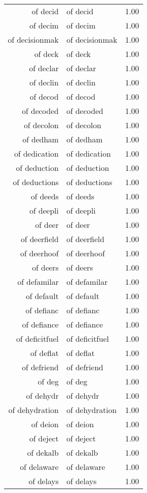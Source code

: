 \begin{table}[ht]
\begin{tabular}{rlr}
  of decid & of decid & 1.00 \\ 
  of decim & of decim & 1.00 \\ 
  of decisionmak & of decisionmak & 1.00 \\ 
  of deck & of deck & 1.00 \\ 
  of declar & of declar & 1.00 \\ 
  of declin & of declin & 1.00 \\ 
  of decod & of decod & 1.00 \\ 
  of decoded & of decoded & 1.00 \\ 
  of decolon & of decolon & 1.00 \\ 
  of dedham & of dedham & 1.00 \\ 
  of dedication & of dedication & 1.00 \\ 
  of deduction & of deduction & 1.00 \\ 
  of deductions & of deductions & 1.00 \\ 
  of deeds & of deeds & 1.00 \\ 
  of deepli & of deepli & 1.00 \\ 
  of deer & of deer & 1.00 \\ 
  of deerfield & of deerfield & 1.00 \\ 
  of deerhoof & of deerhoof & 1.00 \\ 
  of deers & of deers & 1.00 \\ 
  of defamilar & of defamilar & 1.00 \\ 
  of default & of default & 1.00 \\ 
  of defianc & of defianc & 1.00 \\ 
  of defiance & of defiance & 1.00 \\ 
  of deficitfuel & of deficitfuel & 1.00 \\ 
  of deflat & of deflat & 1.00 \\ 
  of defriend & of defriend & 1.00 \\ 
  of deg & of deg & 1.00 \\ 
  of dehydr & of dehydr & 1.00 \\ 
  of dehydration & of dehydration & 1.00 \\ 
  of deion & of deion & 1.00 \\ 
  of deject & of deject & 1.00 \\ 
  of dekalb & of dekalb & 1.00 \\ 
  of delaware & of delaware & 1.00 \\ 
  of delays & of delays & 1.00 \\ 

\end{tabular}
\end{table}
